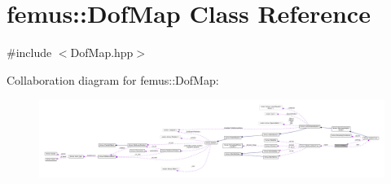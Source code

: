 \hypertarget{classfemus_1_1_dof_map}{}\section{femus\+:\+:Dof\+Map Class Reference}
\label{classfemus_1_1_dof_map}


{\ttfamily \#include $<$Dof\+Map.\+hpp$>$}



Collaboration diagram for femus\+:\+:Dof\+Map\+:
\nopagebreak
\begin{figure}[H]
\begin{center}
\leavevmode
\includegraphics[width=350pt]{classfemus_1_1_dof_map__coll__graph}
\end{center}
\end{figure}

